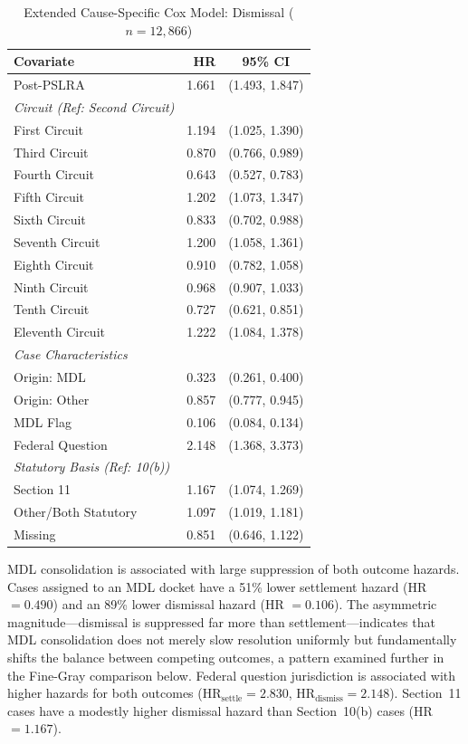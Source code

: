 \begin{table}[tp]
\centering
\caption[Extended Cause-Specific Cox Model: Dismissal]{Extended Cause-Specific Cox Model: Dismissal ($n = 12{,}866$)}
\label{tab:cox_ext_dismiss}
\renewcommand{\arraystretch}{1.2}
\begin{tabular*}{\textwidth}{@{\extracolsep{\fill}} l r c @{}}
\toprule
\textbf{Covariate} & \textbf{HR} & \textbf{95\% CI} \\
\midrule
Post-PSLRA            & 1.661 & (1.493, 1.847) \\
\addlinespace[0.5em]
\textit{Circuit (Ref: Second Circuit)} & & \\
First Circuit         & 1.194 & (1.025, 1.390) \\
Third Circuit         & 0.870 & (0.766, 0.989) \\
Fourth Circuit        & 0.643 & (0.527, 0.783) \\
Fifth Circuit         & 1.202 & (1.073, 1.347) \\
Sixth Circuit         & 0.833 & (0.702, 0.988) \\
Seventh Circuit       & 1.200 & (1.058, 1.361) \\
Eighth Circuit        & 0.910 & (0.782, 1.058) \\
Ninth Circuit         & 0.968 & (0.907, 1.033) \\
Tenth Circuit         & 0.727 & (0.621, 0.851) \\
Eleventh Circuit      & 1.222 & (1.084, 1.378) \\
\addlinespace[0.5em]
\textit{Case Characteristics} & & \\
Origin: MDL           & 0.323 & (0.261, 0.400) \\
Origin: Other         & 0.857 & (0.777, 0.945) \\
MDL Flag              & 0.106 & (0.084, 0.134) \\
Federal Question      & 2.148 & (1.368, 3.373) \\
\addlinespace[0.5em]
\textit{Statutory Basis (Ref: 10(b))} & & \\
Section 11            & 1.167 & (1.074, 1.269) \\
Other/Both Statutory  & 1.097 & (1.019, 1.181) \\
Missing               & 0.851 & (0.646, 1.122) \\
\bottomrule
\end{tabular*}
\end{table}


MDL consolidation is associated with large suppression of both outcome
hazards. Cases assigned to an MDL docket have a 51\% lower settlement
hazard (HR $= 0.490$) and an 89\% lower dismissal
hazard (HR $= 0.106$). The asymmetric
magnitude---dismissal is suppressed far more than settlement---indicates
that MDL consolidation does not merely slow resolution uniformly but
fundamentally shifts the balance between competing outcomes, a pattern
examined further in the Fine-Gray comparison below. Federal question
jurisdiction is associated with higher hazards for both outcomes
($\text{HR}_\text{settle} = 2.830$, $\text{HR}_\text{dismiss} = 2.148$).
Section~11 cases have a modestly higher dismissal hazard than
Section~10(b) cases (HR $= 1.167$).

